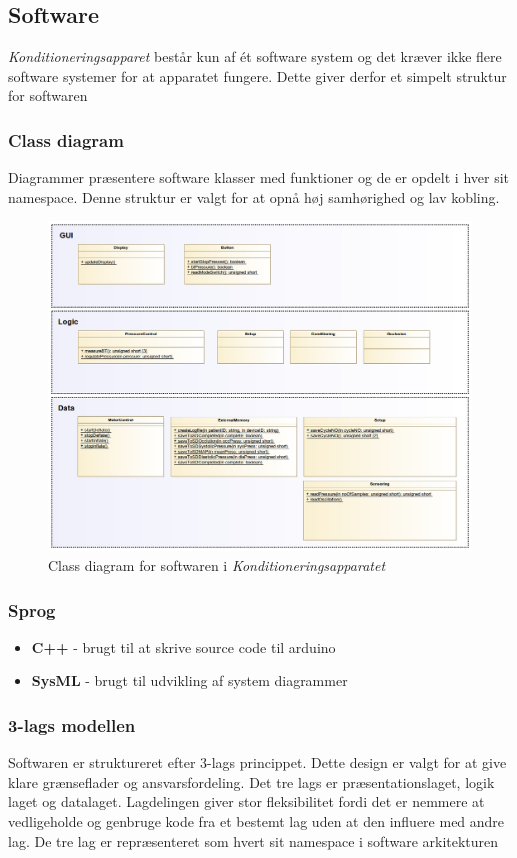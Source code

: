 \subsection{Software}
\textit{Konditioneringsapparet} består kun af ét software system og det kræver ikke flere software systemer for at apparatet fungere. Dette giver derfor et simpelt struktur for softwaren 

\subsubsection{Class diagram}
Diagrammer præsentere software klasser med funktioner og de er opdelt i hver sit namespace. Denne struktur er valgt for at opnå høj samhørighed og lav kobling.
\begin{figure}[H]
	\includegraphics[width=\textwidth]{pdfs/ClassDiagram.png}
	\caption{Class diagram for softwaren i \textit{Konditioneringsapparatet}}
\end{figure}


\subsubsection{Sprog}
\begin{itemize}
	\item \textbf{C++} - brugt til at skrive source code til arduino
	\item \textbf{SysML} - brugt til udvikling af system diagrammer
\end{itemize}

\subsubsection{3-lags modellen}
Softwaren er struktureret efter 3-lags princippet. Dette design er valgt for at give klare grænseflader og ansvarsfordeling. Det tre lags er præsentationslaget, logik laget og datalaget. Lagdelingen giver stor fleksibilitet fordi det er nemmere at vedligeholde og genbruge kode fra et bestemt lag uden at den influere med andre lag. De tre lag er repræsenteret som hvert sit namespace i software arkitekturen

